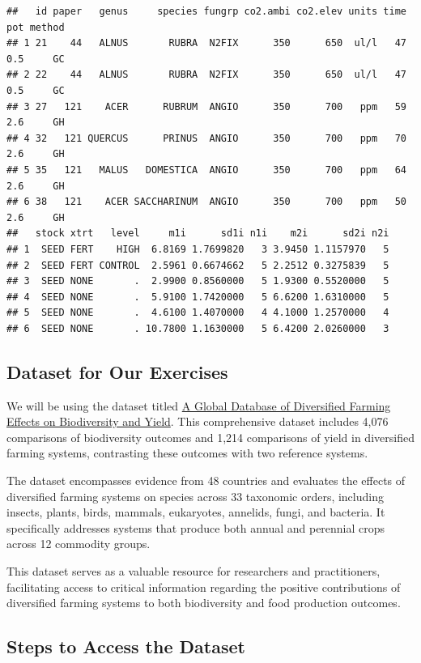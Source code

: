 \documentclass[
]{book}
\begin{document}
\begin{verbatim}
##   id paper   genus     species fungrp co2.ambi co2.elev units time pot method
## 1 21    44   ALNUS       RUBRA  N2FIX      350      650  ul/l   47 0.5     GC
## 2 22    44   ALNUS       RUBRA  N2FIX      350      650  ul/l   47 0.5     GC
## 3 27   121    ACER      RUBRUM  ANGIO      350      700   ppm   59 2.6     GH
## 4 32   121 QUERCUS      PRINUS  ANGIO      350      700   ppm   70 2.6     GH
## 5 35   121   MALUS   DOMESTICA  ANGIO      350      700   ppm   64 2.6     GH
## 6 38   121    ACER SACCHARINUM  ANGIO      350      700   ppm   50 2.6     GH
##   stock xtrt   level     m1i      sd1i n1i    m2i      sd2i n2i
## 1  SEED FERT    HIGH  6.8169 1.7699820   3 3.9450 1.1157970   5
## 2  SEED FERT CONTROL  2.5961 0.6674662   5 2.2512 0.3275839   5
## 3  SEED NONE       .  2.9900 0.8560000   5 1.9300 0.5520000   5
## 4  SEED NONE       .  5.9100 1.7420000   5 6.6200 1.6310000   5
## 5  SEED NONE       .  4.6100 1.4070000   4 4.1000 1.2570000   4
## 6  SEED NONE       . 10.7800 1.1630000   5 6.4200 2.0260000   3
\end{verbatim}

\subsection{Dataset for Our Exercises}\label{dataset-for-our-exercises}

We will be using the dataset titled \href{https://www.nature.com/articles/s41597-021-01000-y}{A Global Database of Diversified Farming Effects on Biodiversity and Yield}.
This comprehensive dataset includes 4,076 comparisons of biodiversity outcomes and 1,214 comparisons of yield in diversified farming systems, contrasting these outcomes with two reference systems.

The dataset encompasses evidence from 48 countries and evaluates the effects of diversified farming systems on species across 33 taxonomic orders, including insects, plants, birds, mammals, eukaryotes, annelids, fungi, and bacteria.
It specifically addresses systems that produce both annual and perennial crops across 12 commodity groups.

This dataset serves as a valuable resource for researchers and practitioners, facilitating access to critical information regarding the positive contributions of diversified farming systems to both biodiversity and food production outcomes.

\subsection{Steps to Access the Dataset}\label{steps-to-access-the-dataset}
\end{document}
